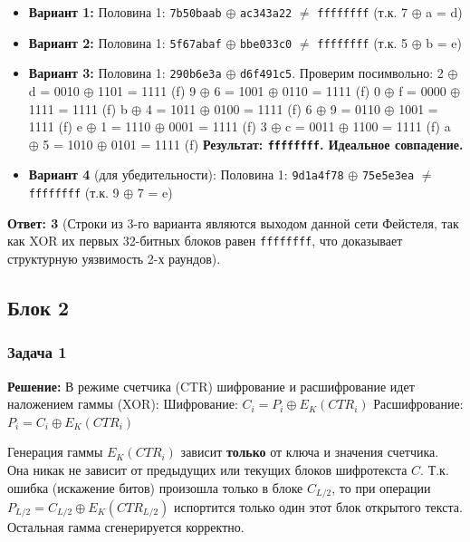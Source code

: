 \begin{enumerate}
  \begin{itemize}
  \item
    \textbf{Вариант 1:} Половина 1: \texttt{7b50baab} \(\oplus\) \texttt{ac343a22} \(\neq\) \texttt{ffffffff} (т.к. 7 \(\oplus\) a = d)
  \item
    \textbf{Вариант 2:} Половина 1: \texttt{5f67abaf} \(\oplus\) \texttt{bbe033c0} \(\neq\) \texttt{ffffffff} (т.к. 5 \(\oplus\) b = e)
  \item
    \textbf{Вариант 3:} Половина 1: \texttt{290b6e3a} \(\oplus\) \texttt{d6f491c5}. Проверим посимвольно: 2 \(\oplus\) d = 0010 \(\oplus\) 1101 = 1111 (f) 9 \(\oplus\) 6 = 1001 \(\oplus\) 0110 = 1111 (f) 0 \(\oplus\) f = 0000 \(\oplus\) 1111 = 1111 (f) b \(\oplus\) 4 = 1011 \(\oplus\) 0100 = 1111 (f) 6 \(\oplus\) 9 = 0110 \(\oplus\) 1001 = 1111 (f) e \(\oplus\) 1 = 1110 \(\oplus\) 0001 = 1111 (f) 3 \(\oplus\) c = 0011 \(\oplus\) 1100 = 1111 (f) a \(\oplus\) 5 = 1010 \(\oplus\) 0101 = 1111 (f) \textbf{Результат: \texttt{ffffffff}. Идеальное совпадение.}
  \item
    \textbf{Вариант 4} (для убедительности): Половина 1: \texttt{9d1a4f78} \(\oplus\) \texttt{75e5e3ea} \(\neq\) \texttt{ffffffff} (т.к. 9 \(\oplus\) 7 = e)
  \end{itemize}
\end{enumerate}

\textbf{Ответ: 3} (Строки из 3-го варианта являются выходом данной сети Фейстеля, так как XOR их первых 32-битных блоков равен \texttt{ffffffff}, что доказывает структурную уязвимость 2-х раундов).

\subsection{Блок 2}\label{ux431ux43bux43eux43a-2}

\subsubsection{Задача 1}\label{ux437ux430ux434ux430ux447ux430-1}

\textbf{Решение:} В режиме счетчика (CTR) шифрование и расшифрование идет наложением гаммы (XOR): Шифрование: \(C_i = P_i \oplus E_K(CTR_i)\) Расшифрование: \(P_i = C_i \oplus E_K(CTR_i)\)

Генерация гаммы \(E_K(CTR_i)\) зависит \textbf{только} от ключа и значения счетчика. Она никак не зависит от предыдущих или текущих блоков шифротекста \(C\). Т.к. ошибка (искажение битов) произошла только в блоке \(C_{L/2}\), то при операции \(P_{L/2} = C_{L/2} \oplus E_K(CTR_{L/2})\) испортится только один этот блок открытого текста. Остальная гамма сгенерируется корректно.

